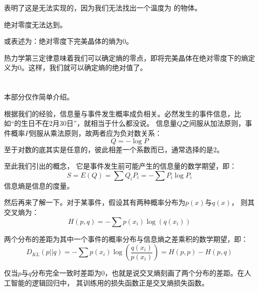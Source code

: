         表明了这是无法实现的，因为我们无法找出一个温度为
        的物体。
        \begin{law}
            绝对零度无法达到。

            或表述为：绝对零度下完美晶体的熵为$0$。
        \end{law}
        热力学第三定律意味着我们可以确定熵的零点，即将完美晶体在绝对零度下的熵定义为$0$。这样，我们就可以确定熵的绝对值了。
    \section[信息]{}
        本部分仅作简单介绍。
        
        根据我们的经验，信息量与事件发生概率成负相关。必然发生的事件信息，比如``\dove 的生日不在2月30日''，就相当于什么都没说。
        信息量$Q$之间服从加法原则，事件概率$P$则服从乘法原则，故两者应为负对数关系：
        \begin{equation}
            Q = - \log P
            \nonumber
        \end{equation}
        至于对数的底其实是任意的，彼此相差一个系数而已，通常选择的是$2$。

        至此我们引出的概念，
        它是事件发生前可能产生的信息量的数学期望，即：
        \begin{equation}
            S = E(Q) = \sum Q_{i}P_{i} = -\sum P_{i}\log P_{i}
            \nonumber
        \end{equation}
        信息熵是信息的度量。

        然后再来了解一下。对于某事件，假设其有两种概率分布为$p(x)$与$q(x)$，
        则其交叉熵为：
        \begin{equation}
            H(p,q) = - \sum p({x_{i}})\log(q({x_{i}}))
            \nonumber
        \end{equation}

        两个分布的差距为其中一个事件的概率分布与信息熵之差乘积的数学期望，即：
        \begin{equation}
            D_{KL}(p||q) = - \sum p({x_{i}})\log(\frac{q({x_{i}})}{p({x_{i}})}) = H(p,p)-H(p,q)
            \nonumber
        \end{equation} 

        仅当$p$与$q$分布完全一致时差距为0，也就是说交叉熵刻画了两个分布的差距。在人工智能的逻辑回归中，
        其训练用的损失函数正是交叉熵损失函数。

